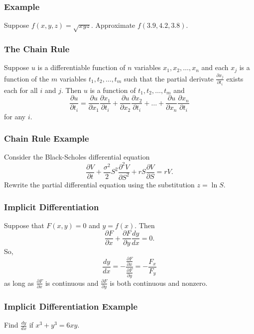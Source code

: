\documentclass{beamer}
\begin{document}
\begin{frame}[t]
\frametitle{Example}
\begin{Example}
Suppose $f(x, y, z) = \sqrt{xyz}$. Approximate $f(3.9, 4.2, 3.8)$.
\end{Example}

\end{frame}

\begin{frame}
\frametitle{The Chain Rule}

Suppose $u$ is a differentiable function of $n$ variables $x_1, x_2,\ldots, x_n$ and each $x_j$ is a function of the $m$ variables $t_1, t_2,\ldots, t_m$ such that the partial derivate $\frac{\partial x_j}{\partial t_i}$ exists each for all $i$ and $j$. Then $u$ is a function of $t_1, t_2,\ldots, t_m$ and
$$
\frac{\partial u}{\partial t_i} = \frac{\partial u}{\partial x_1}\frac{\partial x_1}{\partial t_i} + \frac{\partial u}{\partial x_2}\frac{\partial x_2}{\partial t_i} + \ldots + \frac{\partial u}{\partial x_n}\frac{\partial x_n}{\partial t_i}
$$
for any $i$.

\end{frame}

\begin{frame}[t]
\frametitle{Chain Rule Example}
\begin{Example}
Consider the Black-Scholes differential equation
$$
\frac{\partial V}{\partial t} + \frac{\sigma^2}{2} S^2 \frac{\partial^2 V}{\partial S^2} + r S \frac{\partial V}{\partial S} = r V.
$$
Rewrite the partial differential equation using the substitution $z = \ln S$.
\end{Example}

\end{frame}

\begin{frame}
\frametitle{Implicit Differentiation}
Suppose that $F(x, y) = 0$ and $y = f(x)$. Then
$$
\frac{\partial F}{\partial x} + \frac{\partial F}{\partial y} \frac{d y}{d x} = 0.
$$
So,
$$
\frac{dy}{dx} = -\frac{\frac{\partial F}{\partial x}}{\frac{\partial F}{\partial y}}= - \frac{F_x}{F_y}
$$
as long as $\frac{\partial F}{\partial x}$ is continuous and $\frac{\partial F}{\partial y}$ is both continuous and nonzero.
\end{frame}

\begin{frame}[t]
\frametitle{Implicit Differentiation Example}
\begin{Example}
Find $\frac{dy}{dx}$ if $x^3 + y^3 = 6xy$.
\end{Example}
\end{frame}
\end{document}
